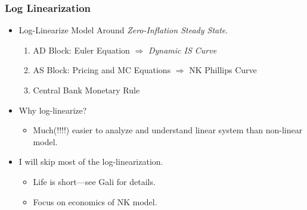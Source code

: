 \documentclass[english,xcolor=svgnames]{beamer}
\begin{document}
\begin{frame}
\frametitle{Log Linearization
}
	\begin{itemize}
		\item  Log-Linearize Model Around \emph{Zero-Inflation Steady State}.
		\begin{enumerate}[1.]
			\item AD Block: Euler Equation $\Rightarrow$ \emph{Dynamic IS Curve}
			\item AS Block: Pricing and MC Equations $\Rightarrow$ NK Phillips Curve
			\item Central Bank Monetary Rule
		\end{enumerate}
	\item Why log-linearize?
	\begin{itemize}
		\item Much(!!!!) easier to analyze and understand linear system than non-linear model.
	\end{itemize}
	\item I will skip most of the log-linearization.
	\begin{itemize}
		\item Life is short---see Gali for details.
		\item Focus on economics of NK model.
	\end{itemize}
	\end{itemize}
\end{frame}
\end{document}
